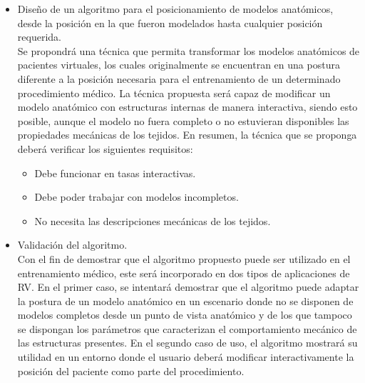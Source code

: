 \begin{itemize}
\item Diseño de un algoritmo para el posicionamiento de modelos anatómicos, desde la posición en la que fueron modelados hasta cualquier posición requerida.
\\

Se propondrá una técnica que permita transformar los modelos anatómicos de pacientes virtuales, los cuales originalmente se encuentran en una postura diferente a la posición necesaria para el entrenamiento de un determinado procedimiento médico. %
La técnica propuesta será capaz de modificar un modelo anatómico con estructuras internas de manera interactiva, siendo esto posible, aunque el modelo no fuera completo o no estuvieran disponibles las propiedades mecánicas de los tejidos. En resumen, la técnica que se proponga deberá verificar los siguientes requisitos:

\begin{itemize}
    \item Debe funcionar en tasas interactivas.
    \item Debe poder trabajar con modelos incompletos.
    \item No necesita las descripciones mecánicas de los tejidos.
    
\end{itemize}


\item 	Validación del algoritmo. \\

Con el fin de demostrar que el algoritmo propuesto puede ser utilizado en el entrenamiento médico, este será incorporado en dos tipos de aplicaciones de \ac{RV}. En el primer caso, se intentará demostrar que el algoritmo puede adaptar la postura de un modelo anatómico en un escenario donde no se disponen de modelos completos desde un punto de vista anatómico y de los que tampoco se dispongan los parámetros que caracterizan el comportamiento mecánico de las estructuras presentes. En el segundo caso de uso, el algoritmo mostrará su utilidad en un entorno donde el usuario deberá modificar interactivamente la posición del paciente como parte del procedimiento. 


\end{itemize}
